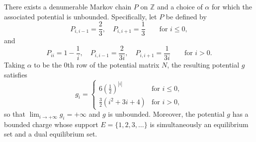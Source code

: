 \begin{proposition}
\label{prop:existence-of-unbounded-potential}
There exists a denumerable Markov chain $P$ on $\mathbb{Z}$ and a choice of $\alpha$ for which the associated potential is unbounded. Specifically, let $P$ be defined by
\[
P_{i,i-1} = \frac{2}{3},\quad P_{i,i+1} = \frac{1}{3} \qquad \text{for } i \leq 0,
\]
and
\[
P_{ii} = 1 - \frac{1}{i},\quad P_{i,i-1} = \frac{2}{3i},\quad P_{i,i+1} = \frac{1}{3i} \qquad \text{for } i > 0.
\]
Taking $\alpha$ to be the $0$th row of the potential matrix $N$, the resulting potential $g$ satisfies
\[
g_i = \begin{cases}
6\left(\frac{1}{2}\right)^{|i|} & \text{for } i \leq 0,\\[4pt]
\frac{3}{2}\left(i^2 + 3i + 4\right) & \text{for } i > 0,
\end{cases}
\]
so that $\displaystyle\lim_{i \to +\infty} g_i = +\infty$ and $g$ is unbounded. Moreover, the potential $g$ has a bounded charge whose support $E = \{1, 2, 3, \ldots\}$ is simultaneously an equilibrium set and a dual equilibrium set.
\end{proposition}
